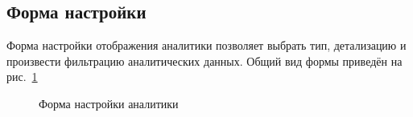 
\subsection{Форма настройки}
\label{analytics:form}

Форма настройки отображения аналитики позволяет выбрать тип, детализацию и произвести фильтрацию
аналитических данных. Общий вид формы приведён на рис.~\ref{analytics:form:pic}

\begin{figure}[H]
	\caption{Форма настройки аналитики}
	\label{analytics:form:pic}
\end{figure}

